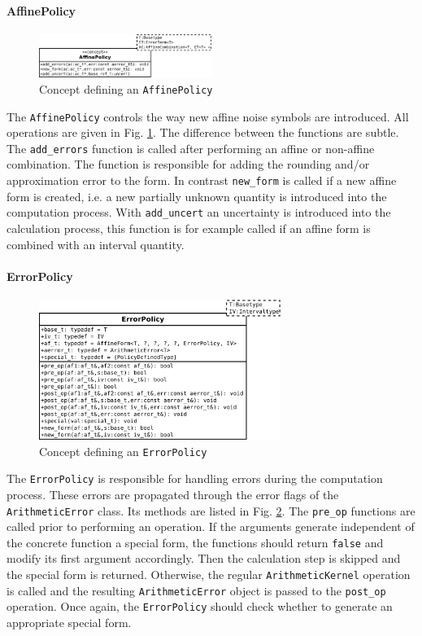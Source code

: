 \documentclass[a4]{scrartcl}
\begin{document}
\paragraph{AffinePolicy}
\begin{figure}[h]
  \centering
  \includegraphics[width=0.5\textwidth]{affinepolicy}
  \caption{Concept defining an \texttt{AffinePolicy}}
  \label{fig:affine_policy}
\end{figure}
The \texttt{AffinePolicy} controls the way new affine noise symbols are
introduced. All operations are given in Fig. \ref{fig:affine_policy}. The
difference between the functions are subtle.  The \texttt{add\_errors}
function is called after performing an affine or non-affine combination. The
function is responsible for adding the rounding and/or approximation error to the
form.  In contrast \texttt{new\_form} is called if a new affine form is
created, i.e. a new partially unknown quantity is introduced into the
computation process. With \texttt{add\_uncert} an uncertainty is introduced
into the calculation process, this function is for example called if an affine
form is combined with an interval quantity.

\paragraph{ErrorPolicy}
\label{sec:errorpolicy}
\begin{figure}[h]
  \centering
  \includegraphics[width=0.7\textwidth]{errorpol}
  \caption{Concept defining an \texttt{ErrorPolicy}}
  \label{fig:error_policy}
\end{figure}
The \texttt{ErrorPolicy} is responsible for handling errors during the
computation process. These errors are propagated through the error flags of
the \texttt{ArithmeticError} class. Its methods are listed in
Fig. \ref{fig:error_policy}. The \texttt{pre\_op} functions are called prior
to performing an operation. If the arguments generate independent of the
concrete function a special form, the functions should return \texttt{false}
and modify its first argument accordingly. Then the calculation step is
skipped and the special form is returned. Otherwise, the regular
\texttt{ArithmeticKernel} operation is called and the resulting
\texttt{ArithmeticError} object is passed to the \texttt{post\_op}
operation. Once again, the \texttt{ErrorPolicy} should check whether to
generate an appropriate special form.
\end{document}
